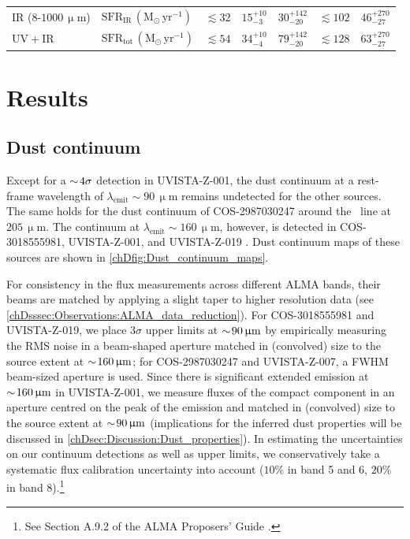\begin{table}
\begin{tabular}{llp{2.05cm}p{2.05cm}p{2.05cm}p{2.05cm}p{2.05cm}}
        \\
        $\mathrm{IR}$ ($8$-$1000 \, \mathrm{\upmu m}$) & $\text{SFR}_\text{IR} \, (\mathrm{M_\odot \, yr^{-1}})$ & $\lesssim32$ & $15_{-3}^{+10}$ & $30_{-20}^{+142}$ & $\lesssim102$ & $46_{-27}^{+270}$
        \\
        $\mathrm{UV+IR}$ & $\text{SFR}_\text{tot} \, (\mathrm{M_\odot \, yr^{-1}})$ & $\lesssim54$ & $34_{-4}^{+10}$ & $79_{-20}^{+142}$ & $\lesssim128$ & $63_{-27}^{+270}$
        \\
        \hline
    \end{tabular}
\end{table}
\restoregeometry
\endgroup

\section{Results}
\label{chDsec:Results}

\subsection{Dust continuum}
\label{chDssec:Results:Dust_continuum}

Except for a $\sim \! 4 \sigma$ detection in UVISTA-Z-001, the dust continuum at a rest-frame wavelength of $\lambda_\text{emit} \sim 90 \, \mathrm{\upmu m}$ remains undetected for the other sources. The same holds for the dust continuum of COS-2987030247 around the \NII\ line at $205 \, \mathrm{\upmu m}$. The continuum at $\lambda_\text{emit} \sim 160 \, \mathrm{\upmu m}$, however, is detected in COS-3018555981, UVISTA-Z-001, and UVISTA-Z-019 \citep[see also][]{2022ApJ...928...31S, 2022MNRAS.510.5088B}. Dust continuum maps of these sources are shown in \cref{chDfig:Dust_continuum_maps}.

For consistency in the flux measurements across different ALMA bands, their beams are matched by applying a slight taper to higher resolution data (see \cref{chDsssec:Observations:ALMA_data_reduction}). For COS-3018555981 and UVISTA-Z-019, we place $3 \sigma$ upper limits at $\sim \! 90 \, \mathrm{\upmu m}$ by empirically measuring the RMS noise in a beam-shaped aperture matched in (convolved) size to the source extent at $\sim \! 160 \, \mathrm{\upmu m}$; for COS-2987030247 and UVISTA-Z-007, a FWHM beam-sized aperture is used. Since there is significant extended emission at $\sim \! 160 \, \mathrm{\upmu m}$ in UVISTA-Z-001, we measure fluxes of the compact component in an aperture centred on the peak of the emission and matched in (convolved) size to the source extent at $\sim \! 90 \, \mathrm{\upmu m}$ (implications for the inferred dust properties will be discussed in \cref{chDsec:Discussion:Dust_properties}). In estimating the uncertainties on our continuum detections as well as upper limits, we conservatively take a systematic flux calibration uncertainty into account ($10 \%$ in band 5 and 6, $20 \%$ in band 8).\footnote{See Section A.9.2 of the ALMA Proposers' Guide \citep{ALMA_proposers_guide}.}

